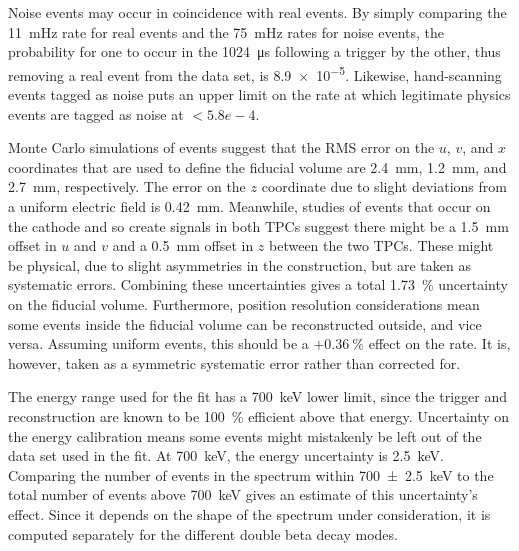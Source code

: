 \documentclass[herrin-thesis.tex]{subfiles}
\begin{document}
Noise events may occur in coincidence with real events. By simply comparing the \SI{11}{\milli\Hz} rate for real events and the \SI{75}{\milli\Hz} rates for noise events, the probability for one to occur in the \SI{1024}{\micro\s} following a trigger by the other, thus removing a real event from the data set, is \num{8.9e-5}. Likewise, hand-scanning events tagged as noise puts an upper limit on the rate at which legitimate physics events are tagged as noise at \(< 5.8e-4\).

Monte Carlo simulations of \twonu{} events suggest that the RMS error on the \(u\), \(v\), and \(x\) coordinates that are used to define the fiducial volume are \SI{2.4}{\mm}, \SI{1.2}{\mm}, and \SI{2.7}{\mm}, respectively. The error on the \(z\) coordinate due to slight deviations from a uniform electric field is \SI{0.42}{\mm}. Meanwhile, studies of events that occur on the cathode and so create signals in both TPCs suggest there might be a \SI{1.5}{\mm} offset in \(u\) and \(v\) and a \SI{0.5}{\mm} offset in \(z\) between the two TPCs. These might be physical, due to slight asymmetries in the construction, but are taken as systematic errors. Combining these uncertainties gives a total \SI{1.73}{\percent} uncertainty on the fiducial volume. Furthermore, position resolution considerations mean some events inside the fiducial volume can be reconstructed outside, and vice versa. Assuming uniform events, this should be a \(+\SI{0.36}{\percent}\) effect on the rate. It is, however, taken as a symmetric systematic error rather than corrected for.

The energy range used for the fit has a \SI{700}{\keV} lower limit, since the trigger and reconstruction are known to be \SI{100}{\percent} efficient above that energy. Uncertainty on the energy calibration means some events might mistakenly be left out of the data set used in the fit. At \SI{700}{\keV}, the energy uncertainty is \SI{2.5}{\keV}. Comparing the number of events in the spectrum within \SI{700\pm2.5}{\keV} to the total number of events above \SI{700}{\keV} gives an estimate of this uncertainty's effect. Since it depends on the shape of the spectrum under consideration, it is computed separately for the different double beta decay modes.
\end{document}
